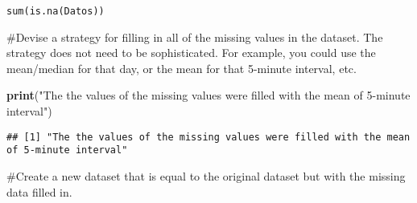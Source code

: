 \documentclass[
]{article}
\newenvironment{Shaded}{\begin{snugshade}}{\end{snugshade}}
\newcommand{\ControlFlowTok}[1]{\textcolor[rgb]{0.13,0.29,0.53}{\textbf{#1}}}
\newcommand{\DecValTok}[1]{\textcolor[rgb]{0.00,0.00,0.81}{#1}}
\newcommand{\KeywordTok}[1]{\textcolor[rgb]{0.13,0.29,0.53}{\textbf{#1}}}
\newcommand{\NormalTok}[1]{#1}
\newcommand{\OperatorTok}[1]{\textcolor[rgb]{0.81,0.36,0.00}{\textbf{#1}}}
\newcommand{\StringTok}[1]{\textcolor[rgb]{0.31,0.60,0.02}{#1}}
\begin{document}
\begin{verbatim}
sum(is.na(Datos))
\end{verbatim}

\#Devise a strategy for filling in all of the missing values in the
dataset. The strategy does not need to be sophisticated. For example,
you could use the mean/median for that day, or the mean for that
5-minute interval, etc.

\begin{Shaded}
\begin{Highlighting}[]
\KeywordTok{print}\NormalTok{(}\StringTok{"The the values of the missing values were filled with the mean of 5-minute interval"}\NormalTok{)}
\end{Highlighting}
\end{Shaded}

\begin{verbatim}
## [1] "The the values of the missing values were filled with the mean of 5-minute interval"
\end{verbatim}

\#Create a new dataset that is equal to the original dataset but with
the missing data filled in.

\begin{Shaded}
\end{Shaded}
\end{document}
